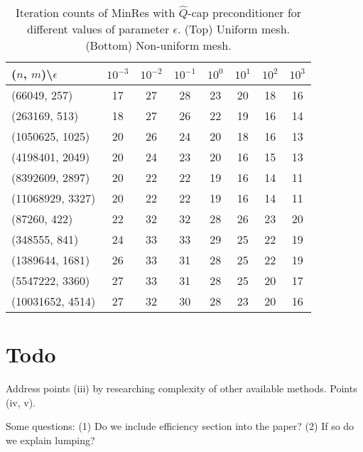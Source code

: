 \documentclass[10pt, a4paper]{article}
\begin{document}
\begin{table}
  \caption{Iteration counts of MinRes with $\hat{Q}$-cap preconditioner for 
  different values of parameter $\epsilon$. (Top) Uniform mesh.
  (Bottom) Non-uniform mesh.
}
\label{tab:hatQcap_iters}
\footnotesize{
\begin{tabular}{l|ccccccc}
\hline
($n$, $m$)\textbackslash $\epsilon$ & $10^{-3}$ & $10^{-2}$ & $10^{-1}$ & $10^{0}$ & $10^{1}$ & $10^{2}$ & $10^{3}$\\
\hline
(66049, 257) & 17 & 27 & 28 & 23 & 20 & 18 & 16\\
(263169, 513) & 18 & 27 & 26 & 22 & 19 & 16 & 14\\
(1050625, 1025) & 20 & 26 & 24 & 20 & 18 & 16 & 13\\
(4198401, 2049) & 20 & 24 & 23 & 20 & 16 & 15 & 13\\
(8392609, 2897) & 20 & 22 & 22 & 19 & 16 & 14 & 11\\
(11068929, 3327) & 20 & 22 & 22 & 19 & 16 & 14 & 11\\
\hline
\hline
(87260, 422) & 22 & 32 & 32 & 28 & 26 & 23 & 20\\
(348555, 841) & 24 & 33 & 33 & 29 & 25 & 22 & 19\\
(1389644, 1681) & 26 & 33 & 31 & 28 & 25 & 22 & 19\\
(5547222, 3360) & 27 & 33 & 31 & 28 & 25 & 20 & 17\\
(10031652, 4514) & 27 & 32 & 30 & 28 & 23 & 20 & 16\\
\hline
\end{tabular}
}
\end{table}



\section*{Todo}
Address points (iii) by researching complexity of other available methods. 
Points (iv, v).

Some questions: (1) Do we include efficiency section into the paper? (2) If so
do we explain lumping?


\end{document}

